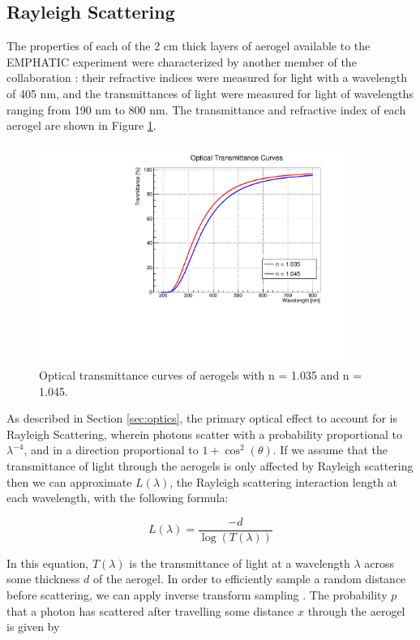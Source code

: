 \subsection{Rayleigh Scattering}
The properties of each of the 2 cm thick layers of aerogel available to the EMPHATIC experiment were characterized by another member of the collaboration \cite{aerogelTabata}: their refractive indices were measured for light with a wavelength of 405 nm, and the transmittances of light were measured for light of wavelengths ranging from 190 nm to 800 nm.
The transmittance and refractive index of each aerogel are shown in Figure \ref{fig:transmittance}.

\begin{figure}[]
  \centering
  \includegraphics[width=0.9\textwidth]{./figs/transmittance.pdf}
    \caption{Optical transmittance curves of aerogels with n = 1.035 and n = 1.045.}
  \label{fig:transmittance}
\end{figure}

As described in Section \ref{sec:optics}, the primary optical effect to account for is Rayleigh Scattering, wherein photons scatter with a probability proportional to $\lambda^{-4}$, and in a direction proportional to $1 + \cos^2(\theta)$.
If we assume that the transmittance of light through the aerogels is only affected by Rayleigh scattering then we can approximate $L(\lambda)$, the Rayleigh scattering interaction length at each wavelength, with the following formula:

\begin{equation}
L(\lambda) = \frac{-d}{\log(T(\lambda))}
    \label{eq:scatLength}
\end{equation}

In this equation, $T(\lambda)$ is the transmittance of light at a wavelength $\lambda$ across some thickness $d$ of the aerogel.
In order to efficiently sample a random distance before scattering, we can apply inverse transform sampling .
The probability $p$ that a photon has scattered after travelling some distance $x$ through the aerogel is given by

